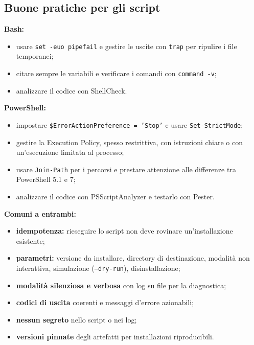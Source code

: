 \documentclass[a4paper, 11pt]{article}
\begin{document}
\subsection{Buone pratiche per gli script}
\textbf{Bash:}
\begin{itemize}[noitemsep]
    \item usare \texttt{set -euo pipefail} e gestire le uscite con \texttt{trap} per ripulire i file temporanei;
    \item citare sempre le variabili e verificare i comandi con \texttt{command -v};
    \item analizzare il codice con ShellCheck.
\end{itemize}
\textbf{PowerShell:}
\begin{itemize}[noitemsep]
    \item impostare \texttt{\$ErrorActionPreference = 'Stop'} e usare \texttt{Set-StrictMode};
    \item gestire la Execution Policy, spesso restrittiva, con istruzioni chiare o con un'esecuzione limitata al processo;
    \item usare \texttt{Join-Path} per i percorsi e prestare attenzione alle differenze tra PowerShell 5.1 e 7;
    \item analizzare il codice con PSScriptAnalyzer e testarlo con Pester.
\end{itemize}
\textbf{Comuni a entrambi:}
\begin{itemize}[noitemsep]
    \item \textbf{idempotenza:} rieseguire lo script non deve rovinare un'installazione esistente;
    \item \textbf{parametri:} versione da installare, directory di destinazione, modalità non interattiva, simulazione (\texttt{--dry-run}), disinstallazione;
    \item \textbf{modalità silenziosa e verbosa} con log su file per la diagnostica;
    \item \textbf{codici di uscita} coerenti e messaggi d'errore azionabili;
    \item \textbf{nessun segreto} nello script o nei log;
    \item \textbf{versioni pinnate} degli artefatti per installazioni riproducibili.
\end{itemize}
\end{document}
